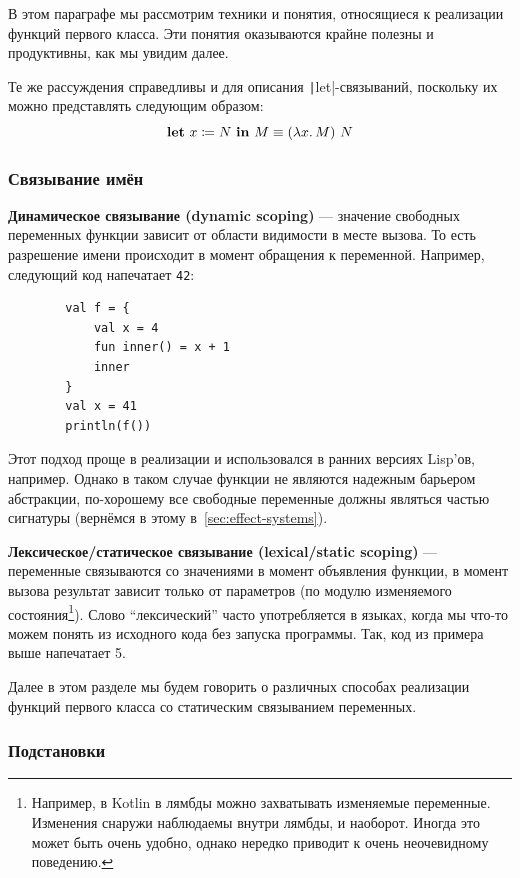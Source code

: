 \documentclass[12pt]{article}
\newcommand{\vocab}[1]{\textbf{#1}} %
\newcommand{\term}[1]{\mathbf{#1}}
\newcommand{\ap}{~}
\newcommand{\termdef}{\coloneqq}
\begin{document}
    В этом параграфе мы рассмотрим техники и понятия, относящиеся к реализации функций первого класса.
    Эти понятия оказываются крайне полезны и продуктивны, как мы увидим далее.

    Те же рассуждения справедливы и для описания \texttt|let|-связываний, поскольку их можно представлять следующим образом:
    \[
        \term{let} \ap x \termdef N \ap \term{in} \ap M \equiv (\lambda x\ldotp M) \ap N
    \]

    \subsubsection{Связывание имён}

    \vocab{Динамическое связывание (dynamic scoping)} --- значение свободных переменных функции зависит от области видимости в месте вызова.
    То есть разрешение имени происходит в момент обращения к переменной.
    Например, следующий код напечатает \texttt{42}:
    \begin{verbatim}
        val f = {
            val x = 4
            fun inner() = x + 1
            inner
        }
        val x = 41
        println(f())
    \end{verbatim}

    Этот подход проще в реализации и использовался в ранних версиях Lisp'ов, например.
    Однако в таком случае функции не являются надежным барьером абстракции, по-хорошему все свободные переменные должны являться частью сигнатуры (вернёмся в этому в~\ref{sec:effect-systems}).

    \vocab{Лексическое/статическое связывание (lexical/static scoping)} --- переменные связываются со значениями в момент объявления функции, в момент вызова результат зависит только от параметров (по модулю изменяемого состояния\footnote{Например, в Kotlin в лямбды можно захватывать изменяемые переменные. Изменения снаружи наблюдаемы внутри лямбды, и наоборот. Иногда это может быть очень удобно, однако нередко приводит к очень неочевидному поведению.}).
    Слово ``лексический'' часто употребляется в языках, когда мы что-то можем понять из исходного кода без запуска программы.
    Так, код из примера выше напечатает 5.

    Далее в этом разделе мы будем говорить о различных способах реализации функций первого класса со статическим связыванием переменных.

    \subsubsection{Подстановки}
\end{document}
